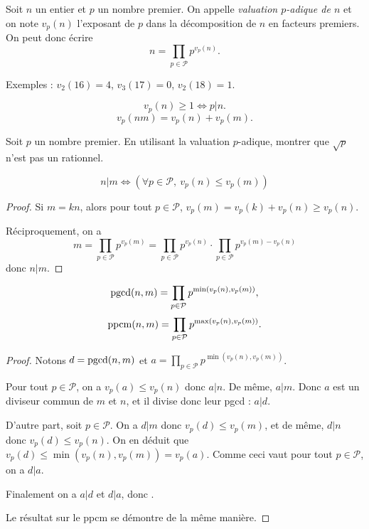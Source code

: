 \begin{definition}
Soit $n$ un entier et $p$ un nombre premier. On appelle \emph{valuation $p$-adique de $n$} et on note $v_p(n)$ l'exposant de $p$ dans la décomposition de $n$ en facteurs premiers. On peut donc écrire 
\[ n = \prod_{p\in \mathcal P} p^{v_p(n)}.\]
\end{definition}

Exemples : $v_2(16)=4$, $v_3(17)=0$, $v_2(18)=1$.

\begin{proposition}
\[ v_p(n)\geq 1 \iff p|n.\]
\[ v_p(nm) = v_p(n)+v_p(m).\]
\end{proposition}


\begin{exercice}
Soit $p$ un nombre premier. En utilisant la valuation $p$-adique, montrer que $\sqrt p$ n'est pas un rationnel. 
\end{exercice}

\begin{proposition}
\[ 
n|m \iff \left(\forall p\in \mathcal P, \: v_p(n)\leq v_p(m)\right)
\]
\end{proposition}
\begin{proof}
Si $m = kn$, alors pour tout $p\in \mathcal P$, $v_p(m) = v_p(k)+v_p(n) \geq v_p(n)$.

Réciproquement, on a 
\[ 
m
= \prod_{p\in\mathcal P}p^{v_p(m)}
= \prod_{p\in\mathcal P}p^{v_p(n)} \cdot \prod_{p\in\mathcal P}p^{v_p(m)-v_p(n)}
\]
donc $n|m$.
\end{proof}

\begin{corollaire}
\[
\operatorname{pgcd}(n,m) = \prod_{p\in\mathcal P}p^{\min(v_p(n),v_p(m))},
\]
\[
\operatorname{ppcm}(n,m) = \prod_{p\in\mathcal P}p^{\max(v_p(n),v_p(m))}.
\]
\end{corollaire}
\begin{proof}
Notons $d=\operatorname{pgcd}(n,m)$ et $a = \prod_{p\in\mathcal P}p^{\min(v_p(n),v_p(m))}$.

Pour tout $p\in \mathcal P$, on a $v_p(a) \leq v_p(n)$ donc $a|n$. De même, $a|m$. Donc $a$ est un diviseur commun de $m$ et $n$, et il divise donc leur pgcd : $a|d$.

D'autre part, soit $p \in \mathcal P$. On a $d|m$ donc $v_p(d)\leq v_p(m)$, et de même, $d|n$ donc $v_p(d)\leq v_p(n)$. On en déduit que $v_p(d) \leq \min(v_p(n),v_p(m)) = v_p(a)$. Comme ceci vaut pour tout $p\in \mathcal P$, on a $d|a$.

Finalement on a $a|d$ et $d|a$, donc .

Le résultat sur le ppcm se démontre de la même manière.
\end{proof}

